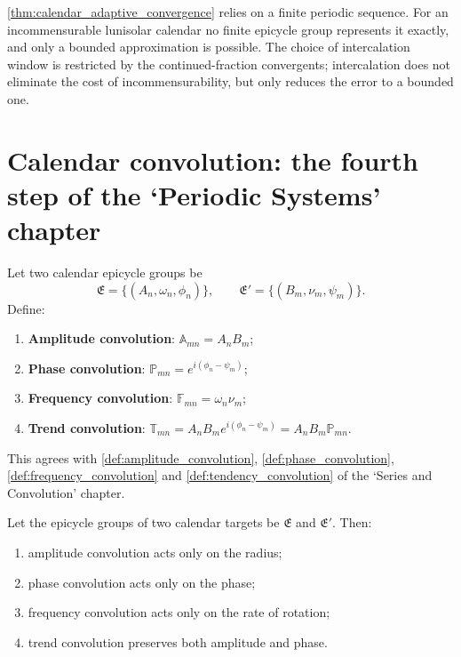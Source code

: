 \begin{remark}\label{rem:calendar_adaptive_boundary}
\cref{thm:calendar_adaptive_convergence} relies on a finite periodic sequence. For an incommensurable lunisolar calendar no finite epicycle group represents it exactly, and only a bounded approximation is possible. The choice of intercalation window is restricted by the continued-fraction convergents; intercalation does not eliminate the cost of incommensurability, but only reduces the error to a bounded one.
\end{remark}

\section{Calendar convolution: the fourth step of the `Periodic Systems' chapter}
\label{sec:calendar_convolution}

\begin{definition}\label{def:calendar_convolution_types}
Let two calendar epicycle groups be
\[
\mathfrak E=\{(A_n,\omega_n,\phi_n)\},\qquad
\mathfrak E'=\{(B_m,\nu_m,\psi_m)\}.
\]
Define:
\begin{enumerate}[label=(\roman*)]
    \item \textbf{Amplitude convolution}: \(\mathbb A_{mn}=A_nB_m\);
    \item \textbf{Phase convolution}: \(\mathbb P_{mn}=e^{i(\phi_n-\psi_m)}\);
    \item \textbf{Frequency convolution}: \(\mathbb F_{mn}=\omega_n\nu_m\);
    \item \textbf{Trend convolution}: \(\mathbb T_{mn}=A_nB_m e^{i(\phi_n-\psi_m)}=A_nB_m\mathbb P_{mn}\).
\end{enumerate}
This agrees with \cref{def:amplitude_convolution}, \cref{def:phase_convolution}, \cref{def:frequency_convolution} and \cref{def:tendency_convolution} of the `Series and Convolution' chapter.
\end{definition}

\begin{theorem}\label{thm:calendar_convolution_action}
Let the epicycle groups of two calendar targets be \(\mathfrak E\) and \(\mathfrak E'\). Then:
\begin{enumerate}[label=(\roman*)]
    \item amplitude convolution acts only on the radius;
    \item phase convolution acts only on the phase;
    \item frequency convolution acts only on the rate of rotation;
    \item trend convolution preserves both amplitude and phase.
\end{enumerate}
\end{theorem}

